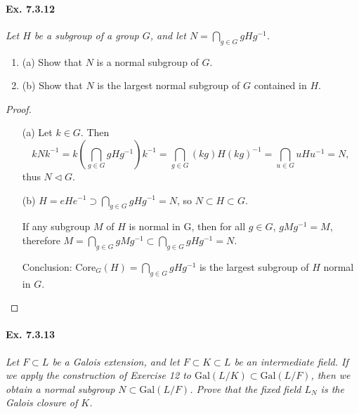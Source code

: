\documentclass[11pt,a4paper]{article}
\newcommand{\be} {\begin{enumerate}}
\newcommand{\ee} {\end{enumerate}}
\newcommand{\Gal}{\mathrm{Gal}}
\begin{document}
\paragraph{Ex. 7.3.12}

{\it Let $H$ be a subgroup of a group $G$, and let $N = \bigcap_{g\in G} gHg^{-1}$.
\be
\item[(a)] Show that $N$ is a normal subgroup of $G$.
\item[(b)] Show that $N$ is the largest normal subgroup of $G$ contained in $H$.
\ee
}

\begin{proof}
\begin{enumerate}
\item[(a)]
Let $k \in G$. Then
$$kNk^{-1} = k \left(\bigcap\limits_{g\in G}gHg^{-1}\right)k^{-1} = \bigcap\limits_{g\in G}(kg)H(kg)^{-1} = \bigcap\limits_{u\in G}uHu^{-1} = N,$$
thus $N \lhd G$.

\item[(b)]
$H = eHe^{-1} \supset \bigcap\limits_{g\in G}gHg^{-1}=N$, so $ N \subset H \subset G$.

If any subgroup $M$ of $H$ is normal in G, then for all $g\in G$, $gMg^{-1} = M$, therefore $M = \bigcap\limits_{g\in G}gMg^{-1} \subset \bigcap\limits_{g\in G}gHg^{-1}=N$.

Conclusion:  $\mathrm{Core}_G(H) = \bigcap\limits_{g\in G}gHg^{-1}$ is the largest subgroup of $H$ normal in $G$.
\end{enumerate}
\end{proof}

\paragraph{Ex. 7.3.13}

{\it Let $F \subset L$ be a Galois extension, and let $F\subset K \subset L$ be an intermediate field. If we apply the construction of Exercise 12 to $\Gal(L/K) \subset \Gal(L/F)$, then we obtain a normal subgroup $N \subset \Gal(L/F)$. Prove that the fixed field $L_N$ is the Galois closure of $K$.
}
\end{document}
